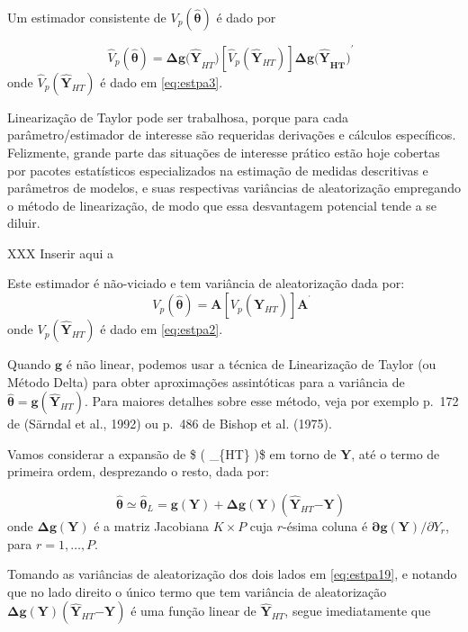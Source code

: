 \documentclass[
  12pt,
  brazilian,
]{book}
\theoremstyle{definition}
\theoremstyle{definition}
\theoremstyle{definition}
\theoremstyle{definition}
\theoremstyle{remark}
\begin{document}
Um estimador consistente de \(V_{p} \left( \mathbf{\widehat{\theta}}\right)\) é dado por

\[
\widehat{V}_{p} \left( \mathbf{\widehat{\theta}} \right) = \mathbf{\Delta g( \widehat{Y} }_{HT} \mathbf{)} \left[ \widehat{V}_{p} \left( \mathbf{\widehat{Y}}_{HT} \right) \right] \mathbf{\Delta g\mathbf{(\widehat{Y}}_{HT} \mathbf{)}}^{\prime} \,\,\,  \label{eq:estpa21}
\]
onde \(\widehat{V}_{p}\left( \mathbf{\widehat{Y}}_{HT}\right)\) é dado em \eqref{eq:estpa3}.

Linearização de Taylor pode ser trabalhosa, porque para cada parâmetro/estimador de interesse são requeridas derivações e cálculos específicos. Felizmente, grande parte das situações de interesse prático estão hoje cobertas por pacotes estatísticos especializados na estimação de medidas descritivas e parâmetros de modelos, e suas respectivas variâncias de aleatorização empregando o método de linearização, de modo que essa desvantagem potencial tende a se diluir.

XXX Inserir aqui a

Este estimador é não-viciado e tem variância de aleatorização dada por:
\[
V_{p}\left( \mathbf{\widehat{\theta}} \right) = \mathbf{A} \left[ V_{p} \left( \mathbf{\widehat{Y}}_{HT} \right) \right] \mathbf{A}^{^{\prime }} \,\,
\]
onde \(V_{p} \left( \mathbf{\widehat{Y}}_{HT}\right)\) é dado em \eqref{eq:estpa2}.

Quando \(\mathbf{g}\) é não linear, podemos usar a técnica de Linearização de Taylor (ou Método Delta) para obter aproximações assintóticas para a variância de
\(\mathbf{ \widehat{\theta}} = \mathbf{g} \left( \widehat{\mathbf{Y}}_{HT}\right)\). Para maiores detalhes sobre esse método, veja por exemplo p.~172 de (Särndal et al., 1992) ou p.~486 de Bishop et al. (1975).

Vamos considerar a expansão de \$  \left( \_\{HT\} \right)\$ em torno de \(\mathbf{Y}\), até o termo de primeira ordem, desprezando o resto, dada por:

\[
\mathbf{\widehat{\theta} \simeq \widehat{\theta}}_{L} = \mathbf{g(Y) + \Delta g(Y)} \left( \mathbf{\widehat{Y}}_{HT} \mathbf{-Y} \right) \,\,\, \label{eq:estpa19}
\]
onde \(\mathbf{\Delta g(Y)}\) é a matriz Jacobiana \(K \times P\) cuja \(r\)-ésima coluna é \(\mathbf{\partial g(Y)/}\partial Y_{r}\), para \(r=1,\ldots, P\).

Tomando as variâncias de aleatorização dos dois lados em \eqref{eq:estpa19}, e notando que no lado direito o único termo que tem variância de aleatorização
\(\mathbf{\Delta g(Y)}\left( \mathbf{\widehat{Y}}_{HT}\mathbf{-Y}\right)\) é uma função linear de \(\mathbf{\widehat{Y}}_{HT}\), segue imediatamente que
\end{document}
